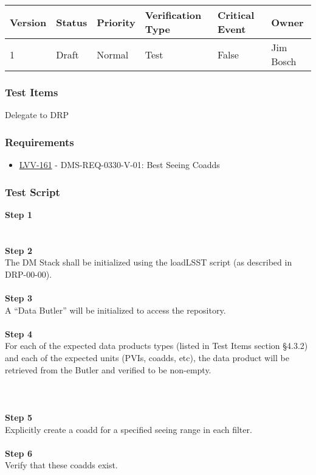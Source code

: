 \begin{longtable}[]{@{}llllll@{}}
\toprule
Version & Status & Priority & Verification Type & Critical Event &
Owner\tabularnewline
\midrule
\endhead
1 & Draft & Normal & Test & False & Jim Bosch\tabularnewline
\bottomrule
\end{longtable}

\hypertarget{test-items-53}{%
\subsubsection{Test Items}\label{test-items-53}}

Delegate to DRP

\hypertarget{requirements-54}{%
\subsubsection{Requirements}\label{requirements-54}}

\begin{itemize}
\tightlist
\item
  \href{https://jira.lsstcorp.org/browse/LVV-161}{LVV-161} -
  DMS-REQ-0330-V-01: Best Seeing Coadds
\end{itemize}

\hypertarget{test-script-54}{%
\subsubsection{Test Script}\label{test-script-54}}

\textbf{Step 1}\\
~\\
~\\
\textbf{Step 2}\\
The DM Stack shall be initialized using the loadLSST script (as
described in DRP-00-00).\\
~\\
\textbf{Step 3}\\
A ``Data Butler'' will be initialized to access the repository.\\
~\\
\textbf{Step 4}\\
For each of the expected data products types (listed in Test Items
section §4.3.2) and each of the expected units (PVIs, coadds, etc), the
data product will be retrieved from the Butler and verified to be
non-empty.\\
~\\
~\\
~\\
\textbf{Step 5}\\
Explicitly create a coadd for a specified seeing range in each filter.\\
~\\
\textbf{Step 6}\\
Verify that these coadds exist.\\
~\\

